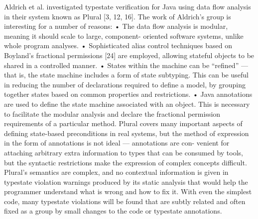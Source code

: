 Aldrich et al. investigated typestate verification for Java using data flow analysis in their system known as Plural [3, 12, 16]. The work of Aldrich’s group is interesting for a number of reasons:
• The data flow analysis is modular, meaning it should scale to large, component- oriented software systems, unlike whole program analyses.
• Sophisticated alias control techniques based on Boyland’s fractional permissions [24] are employed, allowing stateful objects to be shared in a controlled manner.
• States within the machine can be “refined” — that is, the state machine includes a form of state subtyping. This can be useful in reducing the number of declarations required to define a model, by grouping together states based on common properties and restrictions.
• Java annotations are used to define the state machine associated with an object. This is necessary to facilitate the modular analysis and declare the fractional permission requirements of a particular method.
Plural covers many important aspects of defining state-based preconditions in real systems, but the method of expression in the form of annotations is not ideal — annotations are con- venient for attaching arbitrary extra information to types that can be consumed by tools, but the syntactic restrictions make the expression of complex concepts difficult.
Plural’s semantics are complex, and no contextual information is given in typestate violation warnings produced by its static analysis that would help the programmer understand what is wrong and how to fix it. With even the simplest code, many typestate violations will be found that are subtly related and often fixed as a group by small changes to the code or typestate annotations.




